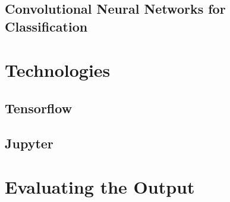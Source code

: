 \subsection{Convolutional Neural Networks for Classification}


\section{Technologies}
\subsection{Tensorflow}
\subsection{Jupyter}

\section{Evaluating the Output}


